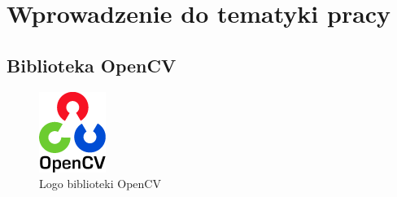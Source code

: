 \chapter{Wprowadzenie do tematyki pracy}
\label{cha:tematykaPracy}
\section{Biblioteka OpenCV}

\begin{figure}
\centering

\includegraphics[width=82px]{img/ocv_logo}
\caption{Logo biblioteki OpenCV \cite{OpenCVLogo}}
\end{figure}

